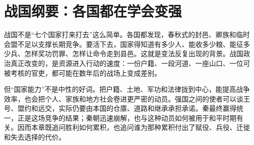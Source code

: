 \section{战国纲要：各国都在学会变强}

战国不是“七个国家打来打去”这么简单。各国都发现，春秋式的封邑、卿族和临时会盟不足以支撑长期竞争。要活下去，国家得知道有多少人、能收多少粮、能征多少兵、怎样奖功罚罪、怎样让命令走到县邑。这就是变法反复出现的背景。战国政治真正改变的，是资源进入行动的速度：一份户籍、一段河道、一座山口、一位可被考核的官吏，都可能在数年后的战场上变成差别。

但“国家能力”不是中性的好词。把户籍、土地、军功和法律拢到中心，能提高战争效率，也会把个人、家族和地方社会卷进更严密的动员。强国之间的使者可以谈王号、盟约和远交，实际仍要由本国的仓廪、道路和继承承担承诺。秦最终赢得统一，正是这场竞争的结果；秦朝迅速崩解，也与这种动员如何被用于和平时期有关。因而本章既追问胜利如何累积，也追问谁为那种累积付出了赋役、兵役、迁徙和失去选择的代价。
